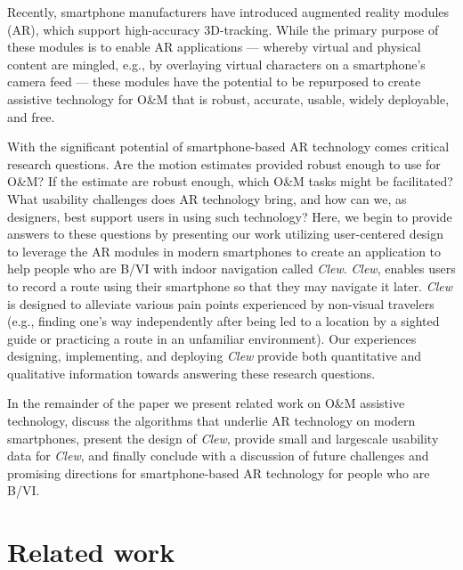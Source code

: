 \documentclass[chi_draft]{sigchi}
\newcommand{\BVI}{B/VI\xspace}
\newcommand{\OM}{O\&M\xspace}
\begin{document}
Recently, smartphone manufacturers have introduced augmented reality modules (AR), which support high-accuracy 3D-tracking.  While the primary purpose of these modules is to enable AR applications --- whereby virtual and physical content are mingled, e.g., by overlaying virtual characters on a smartphone's camera feed --- these modules have the potential to be repurposed to create assistive technology for \OM that is robust, accurate, usable, widely deployable, and free.

With the significant potential of smartphone-based AR technology comes critical research questions.  Are the motion estimates provided robust enough to use for \OM? If the estimate are robust enough, which \OM tasks might be facilitated?  What usability challenges does AR technology bring, and how can we, as designers, best support users in using such technology?  Here, we begin to provide answers to these questions by presenting our work utilizing user-centered design to leverage the AR modules in modern smartphones to create an application to help people who are \BVI with indoor navigation called \emph{Clew}.  \emph{Clew}, enables users to record a route using their smartphone so that they may navigate it later.  \emph{Clew} is designed to alleviate various pain points experienced by non-visual travelers (e.g., finding one's way independently after being led to a location by a sighted guide or practicing a route in an unfamiliar environment).  Our experiences designing, implementing, and deploying \emph{Clew} provide both quantitative and qualitative information towards answering these research questions.%

In the remainder of the paper we present related work on \OM assistive technology, discuss the algorithms that underlie AR technology on modern smartphones, present the design of \emph{Clew}, provide small and largescale usability data for \emph{Clew}, and finally conclude with a discussion of future challenges and promising directions for smartphone-based AR technology for people who are \BVI.

\section{Related work}
\end{document}

